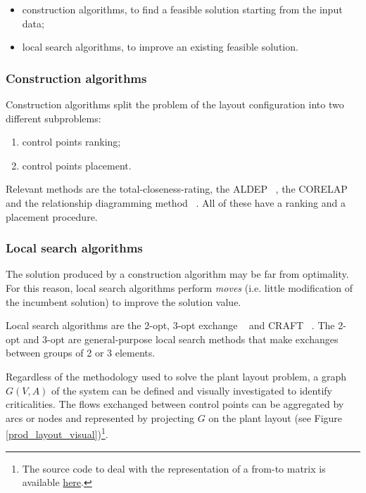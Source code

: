 \begin{itemize}
    \item construction algorithms, to find a feasible solution starting from the input data;
    \item local search algorithms, to improve an existing feasible solution.

\end{itemize}

\subsubsection{Construction algorithms}
Construction algorithms split the problem of the layout configuration into two different subproblems:

\begin{enumerate}
    \item control points ranking;
    \item control points placement.

\end{enumerate}

Relevant methods are the total-closeness-rating, the ALDEP ~\cite{Rosenblatt1979}, the CORELAP ~\cite{Adendorff1972} and the relationship diagramming method ~\cite{Plotnick2007}. All of these have a ranking and a placement procedure.

\subsubsection{Local search algorithms}
The solution produced by a construction algorithm may be far from optimality. For this reason, local search algorithms perform \textit{moves} (i.e. little modification of the incumbent solution) to improve the solution value.\par

Local search algorithms are the 2-opt, 3-opt exchange ~\cite{Potvin1989} and CRAFT ~\cite{Scriabin1985}. The 2-opt and 3-opt are general-purpose local search methods that make exchanges between groups of 2 or 3 elements.

Regardless of the methodology used to solve the plant layout problem, a graph $G\left(V,A\right)$ of the system can be defined and visually investigated to identify criticalities. The flows exchanged between control points can be aggregated by arcs or nodes and represented by projecting $G$ on the plant layout (see Figure \ref{prod_layout_visual})\footnote{The source code to deal with the representation of a from-to matrix is available \href{https://github.com/aletuf93/logproj/blob/master/logproj/P3_flowProblem/assessFlows.py}{here}.}.

